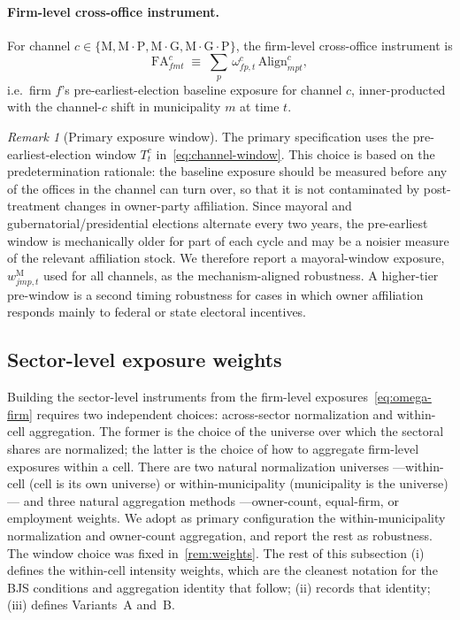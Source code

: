 \documentclass{article}
\newcommand{\Align}{\mathrm{Align}}
\newcommand{\FA}{\mathrm{FA}}
\theoremstyle{plain}
\theoremstyle{definition}
\theoremstyle{remark}
\newtheorem{remark}{Remark}
\begin{document}
\paragraph{Firm-level cross-office instrument.}
For channel $c\in\{\mathrm{M},\mathrm{M{\cdot}P},\mathrm{M{\cdot}G},
\mathrm{M{\cdot}G{\cdot}P}\}$, the firm-level cross-office instrument
is
\begin{equation}\label{eq:FA-firm}
  \FA^{c}_{fmt}
  \;\equiv\;
  \sum_{p}\,\omega^{c}_{fp,t}\,\Align^{c}_{mpt},
\end{equation}
i.e.\ firm $f$'s pre-earliest-election baseline exposure for channel
$c$, inner-producted with the channel-$c$ shift in municipality $m$ at
time $t$.

\begin{remark}[Primary exposure window]\label{rem:weights}
The primary specification uses the pre-earliest-election window $T^c_t$
in~\eqref{eq:channel-window}. This choice is based on the predetermination rationale: the baseline exposure should be measured before any of the offices in the channel can turn over, so that it is not contaminated by post-treatment changes in owner-party affiliation. Since mayoral and
gubernatorial/presidential elections alternate every two years, the
pre-earliest window is mechanically older for part of each cycle and may
be a noisier measure of the relevant affiliation stock. We therefore
report a mayoral-window exposure, $w^{\mathrm{M}}_{jmp,t}$ used for all
channels, as the mechanism-aligned robustness. A higher-tier pre-window
is a second timing robustness for cases in which owner affiliation
responds mainly to federal or state electoral incentives.
\end{remark}

\subsection{Sector-level exposure weights}\label{subsec:sector-weights}

Building the sector-level instruments from the firm-level
exposures~\eqref{eq:omega-firm} requires two independent choices: across-sector normalization and within-cell aggregation. The former is the choice of the universe over which the sectoral shares are normalized; the latter is the choice of how to aggregate firm-level exposures within a cell. There are two natural normalization universes ---within-cell (cell is its own universe) or within-municipality (municipality is the universe)--- and three natural aggregation methods ---owner-count, equal-firm, or employment weights. We adopt as primary configuration the within-municipality normalization and owner-count aggregation, and report the rest as robustness. The window choice was fixed
in~\autoref{rem:weights}. The rest of this subsection (i)
defines the within-cell intensity weights, which are the cleanest
notation for the BJS conditions and aggregation identity that
follow; (ii) records that identity; (iii) defines Variants~A and~B.
\end{document}
